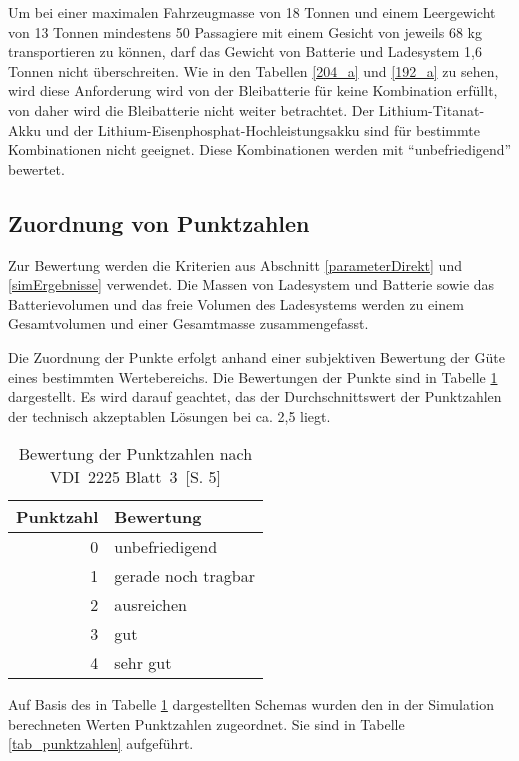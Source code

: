 Um bei einer maximalen Fahrzeugmasse von 18 Tonnen und einem Leergewicht von 13 Tonnen mindestens 50 Passagiere mit einem Gesicht von jeweils 68 kg transportieren zu können, darf das Gewicht von Batterie und Ladesystem 1,6 Tonnen nicht überschreiten. Wie in den Tabellen \ref{204_a} und \ref{192_a} zu sehen, wird diese Anforderung wird von der Bleibatterie für keine Kombination erfüllt, von daher wird die Bleibatterie nicht weiter betrachtet. Der Lithium-Titanat-Akku und der Lithium-Eisenphosphat-Hochleistungsakku sind für bestimmte Kombinationen nicht geeignet. Diese Kombinationen werden mit "`unbefriedigend"' bewertet.

\subsection{Zuordnung von Punktzahlen}
Zur Bewertung werden die Kriterien aus Abschnitt \ref{parameterDirekt} und \ref{simErgebnisse} verwendet. Die Massen von Ladesystem und Batterie sowie das Batterievolumen und das freie Volumen des Ladesystems werden zu einem Gesamtvolumen und einer Gesamtmasse zusammengefasst.

Die Zuordnung der Punkte erfolgt anhand einer subjektiven Bewertung der Güte eines bestimmten Wertebereichs. Die Bewertungen der Punkte sind in Tabelle \ref{tabPunkte} dargestellt. Es wird darauf geachtet, das der Durchschnittswert der Punktzahlen der technisch akzeptablen Lösungen bei ca. 2,5 liegt.

\begin{table} \centering
	\begin{tabular}{rl}
		\toprule
		Punktzahl & Bewertung           \\ \midrule
		        0 & unbefriedigend      \\
		        1 & gerade noch tragbar \\
		        2 & ausreichen          \\
		        3 & gut                 \\
		        4 & sehr gut            \\ \bottomrule
	\end{tabular}
	\caption[Bewertung der Punktzahlen]{Bewertung der Punktzahlen nach VDI~2225 Blatt~3~\cite{vdi:2225}[S. 5]}
	\label{tabPunkte}
\end{table}

Auf Basis des in Tabelle \ref{tabPunkte} dargestellten Schemas wurden den in der Simulation berechneten Werten Punktzahlen zugeordnet. Sie sind in Tabelle \ref{tab_punktzahlen} aufgeführt.

